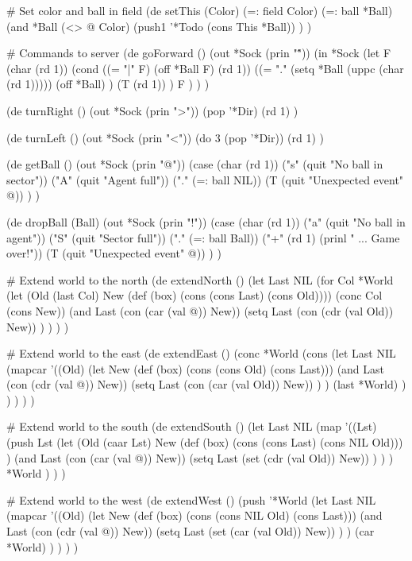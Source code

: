\begin{wideverbatim}

# Set color and ball in field
(de setThis (Color)
   (=: field Color)
   (=: ball *Ball)
   (and
      *Ball
      (<> @ Color)
      (push1 '*Todo (cons This *Ball)) ) )


# Commands to server
(de goForward ()
   (out *Sock (prin "\^"))
   (in *Sock
      (let F (char (rd 1))
         (cond
            ((= "|" F) (off *Ball F) (rd 1))
            ((= "." (setq *Ball (uppc (char (rd 1)))))
               (off *Ball) )
            (T (rd 1)) )
         F ) ) )

(de turnRight ()
   (out *Sock (prin ">"))
   (pop '*Dir)
   (rd 1) )

(de turnLeft ()
   (out *Sock (prin "<"))
   (do 3 (pop '*Dir))
   (rd 1) )

(de getBall ()
   (out *Sock (prin "@"))
   (case (char (rd 1))
      ("s" (quit "No ball in sector"))
      ("A" (quit "Agent full"))
      ("." (=: ball NIL))
      (T (quit "Unexpected event" @)) ) )

(de dropBall (Ball)
   (out *Sock (prin "!"))
   (case (char (rd 1))
      ("a" (quit "No ball in agent"))
      ("S" (quit "Sector full"))
      ("." (=: ball Ball))
      ("+" (rd 1) (prinl " ... Game over!"))
      (T (quit "Unexpected event" @)) ) )

\end{wideverbatim}

\begin{wideverbatim}


# Extend world to the north
(de extendNorth ()
   (let Last NIL
      (for Col *World
         (let (Old (last Col)  New (def (box) (cons (cons Last) (cons Old))))
            (conc Col (cons New))
            (and Last (con (car (val @)) New))
            (setq Last (con (cdr (val Old)) New)) ) ) ) )

# Extend world to the east
(de extendEast ()
   (conc *World
      (cons
         (let Last NIL
            (mapcar
               '((Old)
                  (let New (def (box) (cons (cons Old) (cons Last)))
                     (and Last (con (cdr (val @)) New))
                     (setq Last (con (car (val Old)) New)) ) )
               (last *World) ) ) ) ) )

# Extend world to the south
(de extendSouth ()
   (let Last NIL
      (map
         '((Lst)
            (push Lst
               (let
                  (Old (caar Lst)
                     New (def (box) (cons (cons Last) (cons NIL Old))) )
                  (and Last (con (car (val @)) New))
                  (setq Last (set (cdr (val Old)) New)) ) ) )
         *World ) ) )

# Extend world to the west
(de extendWest ()
   (push '*World
      (let Last NIL
         (mapcar
            '((Old)
               (let New (def (box) (cons (cons NIL Old) (cons Last)))
                  (and Last (con (cdr (val @)) New))
                  (setq Last (set (car (val Old)) New)) ) )
            (car *World) ) ) ) )

\end{wideverbatim}

